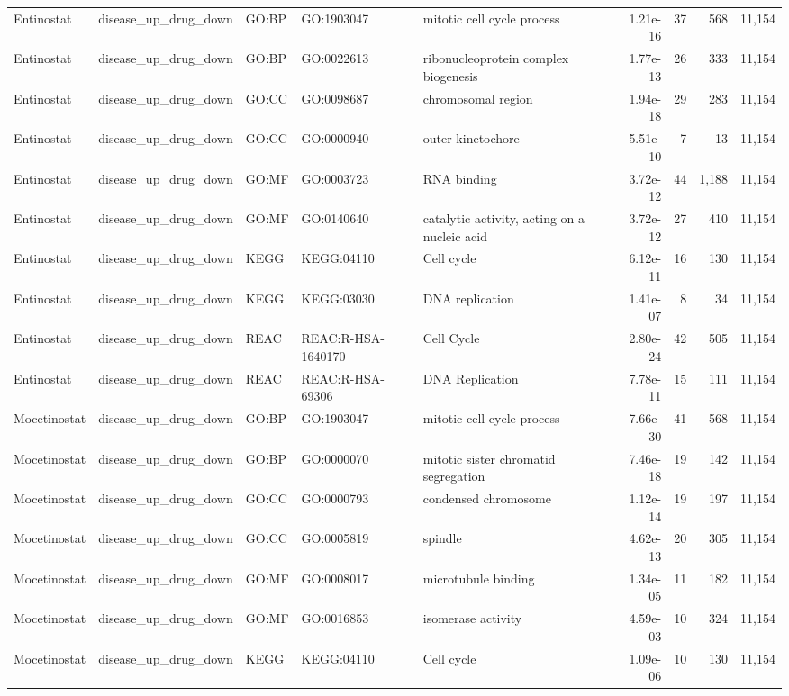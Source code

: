 \begin{landscape}
\begin{longtable}{@{}p{2.0cm}p{3.1cm}p{1.2cm}p{2.2cm}p{6.3cm}rrrr@{}}
Entinostat & disease\_up\_drug\_down & GO:BP & GO:1903047 & mitotic cell cycle process & 1.21e-16 & 37 & 568 & 11,154 \\
Entinostat & disease\_up\_drug\_down & GO:BP & GO:0022613 & ribonucleoprotein complex biogenesis & 1.77e-13 & 26 & 333 & 11,154 \\
Entinostat & disease\_up\_drug\_down & GO:CC & GO:0098687 & chromosomal region & 1.94e-18 & 29 & 283 & 11,154 \\
Entinostat & disease\_up\_drug\_down & GO:CC & GO:0000940 & outer kinetochore & 5.51e-10 & 7 & 13 & 11,154 \\
Entinostat & disease\_up\_drug\_down & GO:MF & GO:0003723 & RNA binding & 3.72e-12 & 44 & 1,188 & 11,154 \\
Entinostat & disease\_up\_drug\_down & GO:MF & GO:0140640 & catalytic activity, acting on a nucleic acid & 3.72e-12 & 27 & 410 & 11,154 \\
Entinostat & disease\_up\_drug\_down & KEGG & KEGG:04110 & Cell cycle & 6.12e-11 & 16 & 130 & 11,154 \\
Entinostat & disease\_up\_drug\_down & KEGG & KEGG:03030 & DNA replication & 1.41e-07 & 8 & 34 & 11,154 \\
Entinostat & disease\_up\_drug\_down & REAC & REAC:R-HSA-1640170 & Cell Cycle & 2.80e-24 & 42 & 505 & 11,154 \\
Entinostat & disease\_up\_drug\_down & REAC & REAC:R-HSA-69306 & DNA Replication & 7.78e-11 & 15 & 111 & 11,154 \\
Mocetinostat & disease\_up\_drug\_down & GO:BP & GO:1903047 & mitotic cell cycle process & 7.66e-30 & 41 & 568 & 11,154 \\
Mocetinostat & disease\_up\_drug\_down & GO:BP & GO:0000070 & mitotic sister chromatid segregation & 7.46e-18 & 19 & 142 & 11,154 \\
Mocetinostat & disease\_up\_drug\_down & GO:CC & GO:0000793 & condensed chromosome & 1.12e-14 & 19 & 197 & 11,154 \\
Mocetinostat & disease\_up\_drug\_down & GO:CC & GO:0005819 & spindle & 4.62e-13 & 20 & 305 & 11,154 \\
Mocetinostat & disease\_up\_drug\_down & GO:MF & GO:0008017 & microtubule binding & 1.34e-05 & 11 & 182 & 11,154 \\
Mocetinostat & disease\_up\_drug\_down & GO:MF & GO:0016853 & isomerase activity & 4.59e-03 & 10 & 324 & 11,154 \\
Mocetinostat & disease\_up\_drug\_down & KEGG & KEGG:04110 & Cell cycle & 1.09e-06 & 10 & 130 & 11,154 \\

\end{longtable}
\end{landscape}
